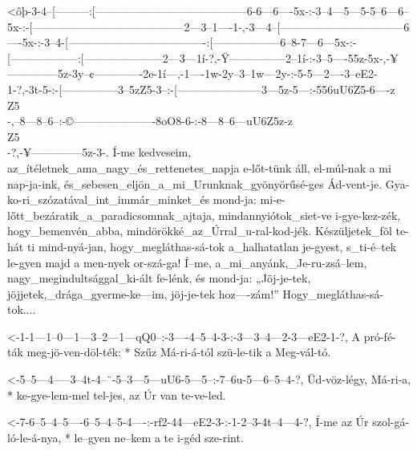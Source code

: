 

  {<ôþ-3-4--[---------:[-----------------------------------------6-6---6----5x-:-3--4---5---5-5--6---6--5x-:-[-----------------------------------------2---3--1----1-,-3---4--[---------------------------------6----5x-:-3--4-[-------------------------------------:[------------------6--8-7---6---5x-:-[------------------:[---------------------2---3---1í-?,-Ÿ---------------2--1í-:-3--5----55z-5x-,-¥--------------5z-3y--¢-------------2e-1í---,-1----1w-2y--3--1w---2y-:-5-5---2----3--eE2-1-?,-3t-5-:-[---------------3--5zZ5-3--:-[-----------------------3---5z-5---:-556uU6Z5-6----z\\Z5\\-,--8---8--6--:-©----------------------8oO8-6-:-8---8--6---uU6Z5z-z\\Z5\\-?,-¥--------------5z-3-.}
  {    Í-me kedveseim, az_ítéletnek_ama_nagy_és_rettenetes_napja e-lőt-tünk áll, el-múl-nak a mi nap-ja-ink, és_sebesen_eljön_a_mi_Urunknak_gyönyörűsé-ges Ád-vent-je. Gya-ko-ri_szózatával_int_immár_minket_és mond-ja:  mi-e-lőtt_bezáratik_a_paradicsomnak_ajtaja, mindannyiótok_siet-ve i-gye-kez-zék, hogy_bemenvén_abba, mindörökké_az_Úrral_u-ral-kod-jék.  Készüljetek_föl te-hát  ti mind-nyá-jan, hogy_megláthas-sá-tok a_halhatatlan je-gyest, s_ti-é--tek le-gyen majd a men-nyek or-szá-ga!  Í--me, a_mi_anyánk,_Je-ru-zsá--lem, nagy_megindultsággal_ki-ált fe-lénk, és       mond-ja:       „Jöj-je-tek, jöjjetek,_drága_gyerme-ke---im, jöj-je-tek hoz----zám!”      Hogy_megláthas-sá-tok....}

  {<-1-1---1--0---1---3--2---1---qQ0--:-3----4--5--4-3-:-3---3--4---2-3---eE2-1-?,}
  {  A pró-fé-ták meg-jö-ven-döl-ték: * Szűz Má-ri-á-tól szü-le-tik a Meg-vál-tó.}

  {<-5--5---4-----3--4t-4--¨-5--3---5---uU6-5---5--:-7--6u-5---6--5--4-?,}
  {  Üd-vöz-légy, Má-ri-a, * ke-gye-lem-mel tel-jes, az Úr van te-ve-led.}

  {<-7-6--5--4--5----6--5--4--5-4----:-rf2-44---eE2-3-:-1-2--3-4t--4---4-?,}
  {  Í-me az Úr szol-gá-ló-le-á-nya, * le--gyen ne--kem a te i-géd sze-rint.}

